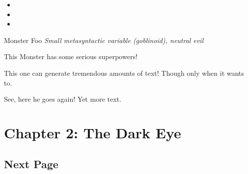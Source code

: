 \documentclass[10pt,%
	a4paper,%
	twoside,%
	twocolumn,%
	openany%
	]{book}
\begin{document}
\lipsum[1]

\begin{paperbox}{\paperimagequad}
	\lipsum[1]
\end{paperbox}

\onecolumn
\begin{twocolumpaperbox}{\paperimagequad}
	\begin{itemize}
		\item \lipsum[1]
		\item \lipsum[1]
		\item \lipsum[1]
	\end{itemize}
\end{twocolumpaperbox}
\twocolumn

\begin{monsterbox}{Monster Foo}
	\textit{Small metasyntactic variable (goblinoid), neutral evil}\\
	\basics[%
	armorclass = 12,
	hitpoints  = 16 (3d8 + 3),
	speed      = 50 ft
	]
	\stats[
    STR = \stat{12}, %
    DEX = \stat{7}
	]
	\details[%
	languages = {Common Lisp, Erlang},
	]
	\begin{monsteraction}
		This Monster has some serious superpowers!
	\end{monsteraction}
	\begin{monsteraction}
		This one can generate tremendous amounts of text! Though only when it wants to.
	\end{monsteraction}

	\begin{monsteraction}
    See, here he goes again! Yet more text.
	\end{monsteraction}
\end{monsterbox}

\chapter{Chapter 2: The Dark Eye}

\section{Next Page}
\lipsum[1] %

\pagebreak

\lipsum[1] %

\pagebreak

\lipsum[1] %

\pagebreak

\lipsum[1] %

\pagebreak

\lipsum[1] %

\pagebreak

\lipsum[1] %

\backmatter

\lastpagebackgroundimg

\lipsum[1] %

\end{document}
